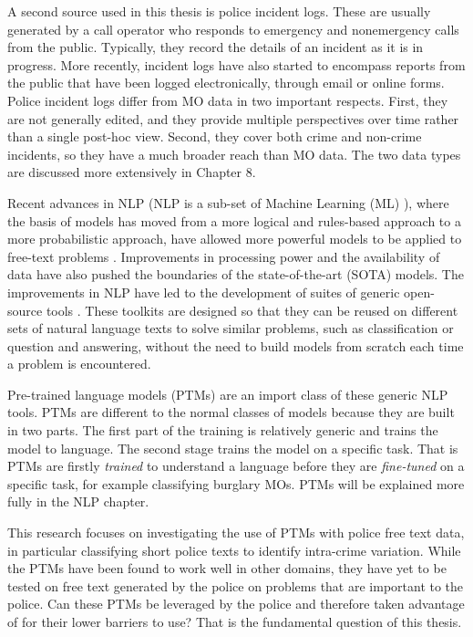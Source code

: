 A second source used in this thesis is police incident logs. These are usually generated by a call operator who responds to emergency and nonemergency calls from the public. Typically, they record the details of an incident as it is in progress. More recently, incident logs have also started to encompass reports from the public that have been logged electronically, through email or online forms. Police incident logs differ from MO data in two important respects. First, they are not generally edited, and they provide multiple perspectives over time rather than a single post-hoc view. Second, they cover both crime and non-crime incidents, so they have a much broader reach than MO data. The two data types are discussed more extensively in Chapter 8.

Recent advances in NLP (NLP is a sub-set of Machine Learning (ML) ), where the basis of models has moved from a more logical and rules-based approach to a more probabilistic approach, have allowed more powerful models to be applied to free-text problems \parencite{kumar2011natural}. Improvements in processing power and the availability of data have also pushed the boundaries of the state-of-the-art (SOTA) models. The improvements in NLP have led to the development of suites of generic open-source tools \parencite{manning2014stanford, benoit2018quanteda, loper2002nltk}. These toolkits are designed so that they can be reused on different sets of natural language texts to solve similar problems, such as classification or question and answering, without the need to build models from scratch each time a problem is encountered.

Pre-trained language models (PTMs) are an import class of these generic NLP tools. PTMs are different to the normal classes of models because they are built in two parts. The first part of the training is relatively generic and trains the model to  language.  The second stage trains the model on a specific task. That is PTMs are firstly \emph{trained} to understand a language before they are \emph{fine-tuned} on a specific task, for example classifying burglary MOs. PTMs will be explained more fully in the NLP chapter.

This research focuses on investigating the use of PTMs with police free text data, in particular classifying short police texts to identify intra-crime variation. While the PTMs have been found to work well in other domains, they have yet to be tested on free text generated by the police on problems that are important to the police. Can these PTMs be leveraged by the police and therefore taken advantage of for their lower barriers to use? That is the fundamental question of this thesis.


